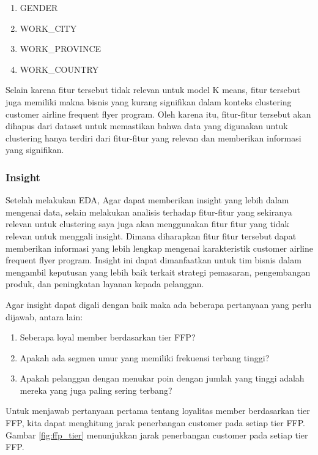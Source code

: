 \begin{enumerate}
    \item GENDER
    \item WORK\_CITY
    \item WORK\_PROVINCE
    \item WORK\_COUNTRY
\end{enumerate}

Selain karena fitur tersebut tidak relevan untuk model K means, fitur tersebut juga memiliki makna bisnis yang kurang signifikan dalam konteks clustering customer airline frequent flyer program. Oleh karena itu, fitur-fitur tersebut akan dihapus dari dataset untuk memastikan bahwa data yang digunakan untuk clustering hanya terdiri dari fitur-fitur yang relevan dan memberikan informasi yang signifikan.

\subsubsection{Insight}
Setelah melakukan EDA, Agar dapat memberikan insight yang lebih dalam mengenai data, selain melakukan analisis terhadap fitur-fitur yang sekiranya relevan untuk clustering saya juga akan menggunakan fitur fitur yang tidak relevan untuk menggali insight. Dimana diharapkan fitur fitur tersebut dapat memberikan informasi yang lebih lengkap mengenai karakteristik customer airline frequent flyer program. Insight ini dapat dimanfaatkan untuk tim bisnis dalam mengambil keputusan yang lebih baik terkait strategi pemasaran, pengembangan produk, dan peningkatan layanan kepada pelanggan. 

Agar insight dapat digali dengan baik maka ada beberapa pertanyaan yang perlu dijawab, antara lain:

\begin{enumerate}
    \item Seberapa loyal member berdasarkan tier FFP?
    \item Apakah ada segmen umur yang memiliki frekuensi terbang tinggi?
    \item Apakah pelanggan dengan menukar poin dengan jumlah yang tinggi adalah mereka yang juga paling sering terbang?
\end{enumerate}

Untuk menjawab pertanyaan pertama tentang loyalitas member berdasarkan tier FFP, kita dapat menghitung jarak penerbangan customer pada setiap tier FFP. Gambar \ref{fig:ffp_tier} menunjukkan jarak penerbangan customer pada setiap tier FFP.

